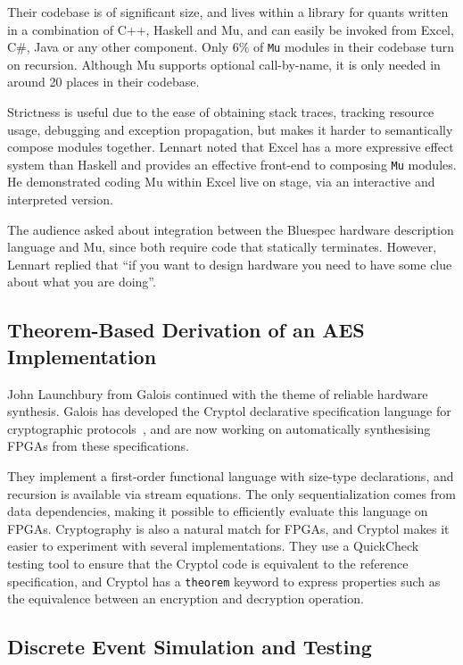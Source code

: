\documentclass{jfp1}
\begin{document}
Their codebase is of significant size, and lives within a library for quants
written in a combination of C++, Haskell and Mu, and can easily be invoked from
Excel, C\#, Java or any other component. Only 6\% of {\tt Mu} modules in their
codebase turn on recursion. Although Mu supports optional call-by-name, it is
only needed in around 20 places in their codebase.

Strictness is useful due to the ease of obtaining stack traces, tracking
resource usage, debugging and exception propagation, but makes it harder to
semantically compose modules together.  Lennart noted that Excel has a more
expressive effect system than Haskell and provides an effective front-end to
composing {\tt Mu} modules. He demonstrated coding Mu within Excel live on stage,
via an interactive and interpreted version.

The audience asked about integration between the Bluespec hardware description
language and Mu, since both require code that statically terminates. However, Lennart
replied that ``if you want to design hardware you need to have some clue about
what you are doing''.

\subsection{Theorem-Based Derivation of an AES Implementation}

John Launchbury from Galois continued with the theme of reliable hardware synthesis. Galois has developed the Cryptol declarative specification language for cryptographic protocols~\cite{xxx}, and are now working on automatically synthesising FPGAs from these specifications.

They implement a first-order functional language with size-type declarations, and recursion is available via stream equations.  The only sequentialization comes from data dependencies, making it possible to efficiently evaluate this language on FPGAs. Cryptography is also a natural match for FPGAs, and Cryptol makes it easier to experiment with several implementations. They use a QuickCheck~\cite{x} testing tool to ensure that the Cryptol code is equivalent to the reference specification, and Cryptol has a {\tt theorem} keyword to express properties such as the equivalence between an encryption and decryption operation.

\subsection{Discrete Event Simulation and Testing}
\end{document}
